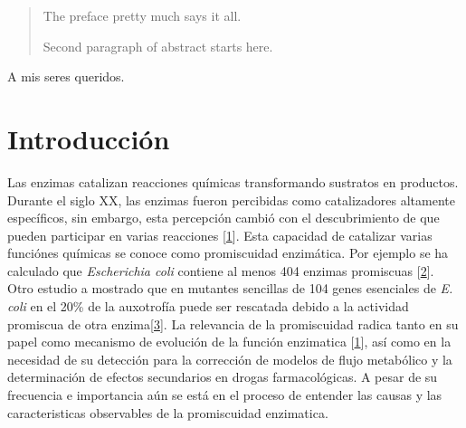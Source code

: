 \documentclass[12pt,twoside]{reedthesis}
\begin{document}
      \hypersetup{linkcolor=black}
    \setcounter{tocdepth}{3}
    \tableofcontents
  
      \listoftables
  
      \listoffigures
  
      \begin{abstract}
      The preface pretty much says it all. \par  Second paragraph of abstract
      starts here.
    \end{abstract}
  
      \begin{dedication}
      A mis seres queridos.
    \end{dedication}
  
  \mainmatter %
  \pagestyle{fancyplain} %

  \chapter*{Introducción}\label{introduccion}
  
  Las enzimas catalizan reacciones químicas transformando sustratos en
  productos. Durante el siglo XX, las enzimas fueron percibidas como
  catalizadores altamente específicos, sin embargo, esta percepción cambió
  con el descubrimiento de que pueden participar en varias reacciones
  {[}\protect\hyperlink{ref-jensen_enzyme_1976}{1}{]}. Esta capacidad de
  catalizar varias funciónes químicas se conoce como promiscuidad
  enzimática. Por ejemplo se ha calculado que \emph{Escherichia coli}
  contiene al menos 404 enzimas promiscuas
  {[}\protect\hyperlink{ref-nam_network_2012}{2}{]}. Otro estudio a
  mostrado que en mutantes sencillas de 104 genes esenciales de \emph{E.
  coli} en el 20\% de la auxotrofía puede ser rescatada debido a la
  actividad promiscua de otra
  enzima{[}\protect\hyperlink{ref-patrick_multicopy_2007}{3}{]}. La
  relevancia de la promiscuidad radica tanto en su papel como mecanismo de
  evolución de la función enzimatica
  {[}\protect\hyperlink{ref-jensen_enzyme_1976}{1}{]}, así como en la
  necesidad de su detección para la corrección de modelos de flujo
  metabólico y la determinación de efectos secundarios en drogas
  farmacológicas. A pesar de su frecuencia e importancia aún se está en el
  proceso de entender las causas y las caracteristicas observables de la
  promiscuidad enzimatica.
  
\end{document}
